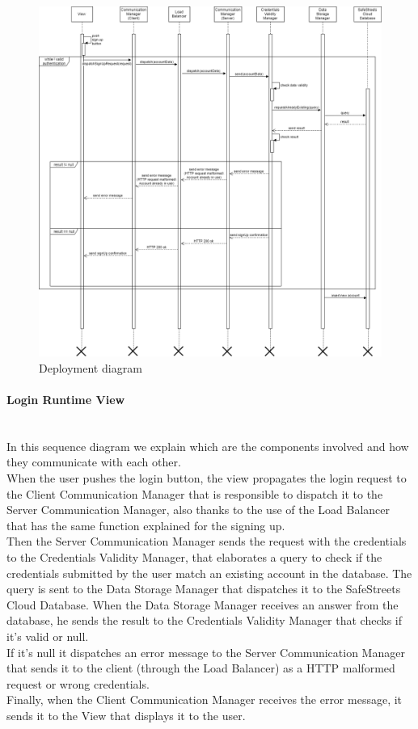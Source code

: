 \documentclass[titlepage]{article}
\begin{document}
\begin{figure}[h]
	\includegraphics[scale=0.42]{Diagrams/Sequence Diagrams/Runtime View Diagram signup.png}
	\caption{Deployment diagram}
\end{figure}
\FloatBarrier

\paragraph{Login Runtime View \\ \\}

In this sequence diagram we explain which are the components involved and how they communicate with each other. \\
When the user pushes the login button, the view propagates the login request to the Client Communication Manager that is responsible to dispatch it to the Server Communication Manager, also thanks to the use of the Load Balancer that has the same function explained for the signing up. \\
Then the Server Communication Manager sends the request with the credentials to the Credentials Validity Manager, that elaborates a query to check if the credentials submitted by the user match an existing account in the database. The query is sent to the Data Storage Manager that dispatches it to the SafeStreets Cloud Database. When the Data Storage Manager receives an answer from the database, he sends the result to the Credentials Validity Manager that checks if it's valid or null. \\
If it's null it dispatches an error message to the Server Communication Manager that sends it to the client (through the Load Balancer) as a HTTP malformed request or wrong credentials. \\
Finally, when the Client Communication Manager receives the error message, it sends it to the View that displays it to the user.
\end{document}
